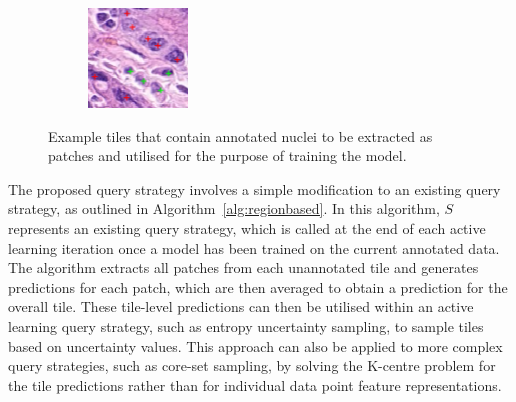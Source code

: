 \begin{figure}[h]
\begin{subfigure}{0.3\textwidth}
	\end{subfigure}
	\begin{subfigure}{0.3\textwidth}
		\includegraphics[width=\linewidth]{images/nuclei_example_3.png}
	\end{subfigure}
	\caption{Example tiles that contain annotated nuclei to be extracted as patches and utilised for the purpose of training the model.}
	\label{fig:nuclei_example}
\end{figure}

The proposed query strategy involves a simple modification to an existing query strategy, as outlined in Algorithm~\ref{alg:regionbased}. In this algorithm, $S$ represents an existing query strategy, which is called at the end of each active learning iteration once a model has been trained on the current annotated data. The algorithm extracts all patches from each unannotated tile and generates predictions for each patch, which are then averaged to obtain a prediction for the overall tile. These tile-level predictions can then be utilised within an active learning query strategy, such as entropy uncertainty sampling, to sample tiles based on uncertainty values. This approach can also be applied to more complex query strategies, such as core-set sampling, by solving the K-centre problem for the tile predictions rather than for individual data point feature representations.

